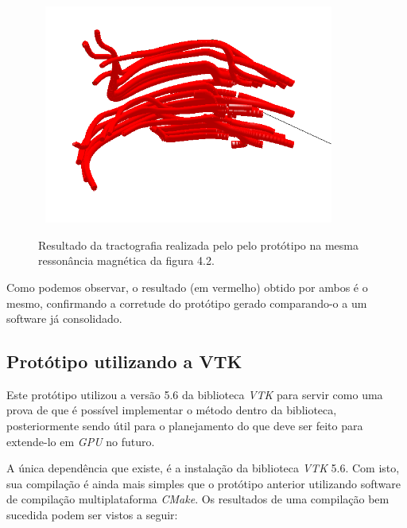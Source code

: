   \begin{figure}[!h]
    \begin{center}
      \includegraphics[width=100mm, height=72mm]{images/prototype-dti.png}
      \label{fig:prototype-dti}
      \caption{Resultado da tractografia realizada pelo pelo protótipo na mesma ressonância magnética da figura 4.2.}
    \end{center}
  \end{figure}
  
  Como podemos observar, o resultado (em vermelho) obtido por ambos é o mesmo, confirmando a corretude do protótipo gerado comparando-o a um software já consolidado.
  
  \subsection{Protótipo utilizando a VTK}
  Este protótipo utilizou a versão 5.6 da biblioteca \textit{VTK} para servir como uma prova de que é possível implementar o método dentro da biblioteca, posteriormente sendo útil para o planejamento do que deve ser feito para extende-lo em \textit{GPU} no futuro.
  
  A única dependência que existe, é a instalação da biblioteca \textit{VTK} 5.6. Com isto, sua compilação é ainda mais simples que o protótipo anterior utilizando software de compilação multiplataforma \textit{CMake}. Os resultados de uma compilação bem sucedida podem ser vistos a seguir:
  
